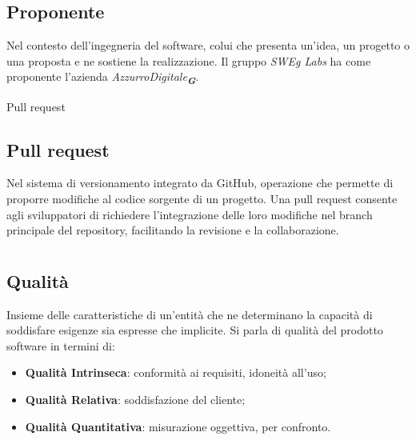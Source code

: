 \subsection*{Proponente}
Nel contesto dell’ingegneria del software, colui che presenta un’idea, un progetto o una proposta e ne sostiene la realizzazione. Il gruppo \emph{SWEg Labs} 
ha come proponente l’azienda \emph{AzzurroDigitale}\textsubscript{\textit{\textbf{G}}}.

\hypertarget{sec:pull_request}{Pull request}
\subsection*{Pull request}
Nel sistema di versionamento integrato da GitHub, operazione che permette di proporre modifiche al codice sorgente di un progetto. 
Una pull request consente agli sviluppatori di richiedere l’integrazione delle loro modifiche nel branch principale del repository, 
facilitando la revisione e la collaborazione.

\newpage



\section{}

\hypertarget{sec:Qualità}{}
\subsection*{Qualità}
Insieme delle caratteristiche di un’entità che ne determinano la capacità di soddisfare esigenze sia espresse che implicite. Si parla di qualità del prodotto software in termini di:
\begin{itemize}
    \item \textbf{Qualità Intrinseca}: conformità ai requisiti, idoneità all’uso;
    \item \textbf{Qualità Relativa}: soddisfazione del cliente;
    \item \textbf{Qualità Quantitativa}: misurazione oggettiva, per confronto.
\end{itemize}


\newpage



\section{}

